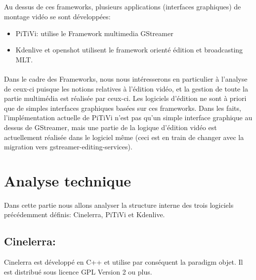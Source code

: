 \subparagraph {}

Au dessus de ces frameworks, plusieurs applications (interfaces
graphiques) de montage vidéo se sont développées:

\begin {itemize}

  \item {PiTiVi: utilise le Framework multimedia GStreamer}

  \item {Kdenlive et openshot utilisent le framework
  orienté édition et broadcasting MLT.}

\end {itemize}

\paragraph {}

Dans le cadre des Frameworks, nous nous intéresserons en particulier
à l'analyse de ceux-ci puisque les notions relatives à l'édition
vidéo, et la gestion de toute la partie multimédia est réalisée
par ceux-ci. Les logiciels d'édition ne sont à priori que de simples
interfaces graphiques basées sur ces frameworks. Dans les faits,
l'implémentation actuelle de PiTiVi n'est pas qu'un simple interface
graphique au dessus de GStreamer, mais une partie de la logique
d'édition vidéo est actuellement réalisée dans le logiciel même
(ceci est en train de changer avec la migration \cite{PitviPortToGes}
vers gstreamer-editing-services\cite{PresentationOfGes}).

\newpage \section{Analyse technique}

\paragraph {}

Dans cette partie nous allons analyser la structure interne des trois
logiciels précédemment définis: Cinelerra, PiTiVi et Kdenlive.

\subsection{Cinelerra:}

Cinelerra est développé en C++ et utilise par conséquent la paradigm
objet.  Il est distribué sous licence GPL Version 2 ou plus.

